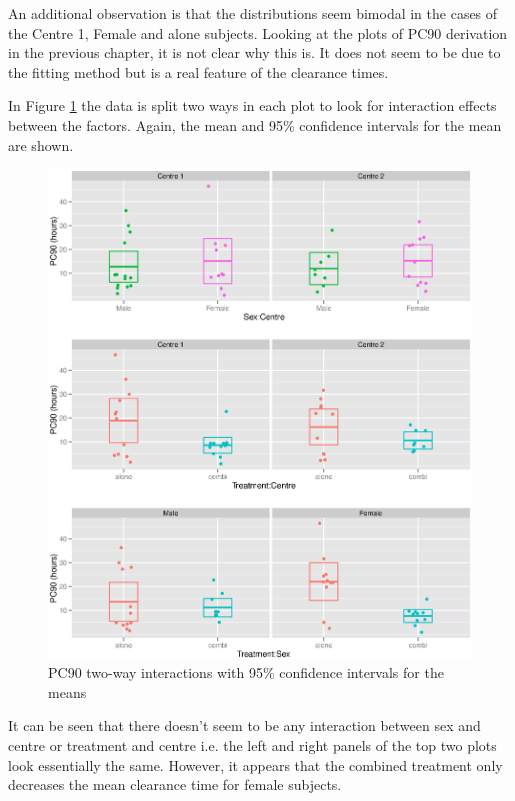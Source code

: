 An additional observation is that the distributions seem bimodal in the cases of the Centre 1, Female and alone subjects. Looking at the plots of PC90 derivation in the previous chapter, it is not clear why this is. It does not seem to be due to the fitting method but is a real feature of the clearance times.

In Figure \ref{pc90interaction} the data is split two ways in each plot to look for interaction effects between the factors. Again, the mean and 95\% confidence intervals for the mean are shown.
\begin{figure}[h]
\includegraphics[width=150mm]{pc90interaction.eps} 
\caption{PC90 two-way interactions with 95\% confidence intervals for the means}
\label{pc90interaction}
\end{figure}
It can be seen that there doesn't seem to be any interaction between sex and centre or treatment and centre i.e. the left and right panels of the top two plots look essentially the same. However, it appears that the combined treatment only decreases the mean clearance time for female subjects.
\clearpage

